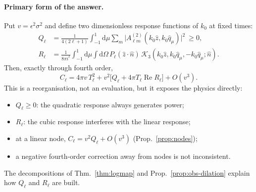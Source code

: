 \documentclass[11pt]{article}
\theoremstyle{definition}
\theoremstyle{remark}
\newcommand{\eps}{\epsilon}
\newcommand{\nh}{\hat n}
\newcommand{\dd}{\mathrm{d}}
\begin{document}
\paragraph{Primary form of the answer.} Put $v=\eps^2\sigma^2$ and define two dimensionless
response functions of $k_0$ at fixed times:
\begin{align}
Q_\ell&=\frac1{4(2\ell+1)}\int_{-1}^1\!\dd\mu\sum_m\big|A^{(2)}_{\ell m}(k_0\hat z,k_0\hat q_\mu)\big|^2\ \ge0,\\
R_\ell&=\frac1{8\pi i^\ell}\int_{-1}^1\!\dd\mu\int\!\dd\Omega\,P_\ell(\hat z\cdot\nh)\,
\mathcal K_3(k_0\hat z,k_0\hat q_\mu,-k_0\hat q_\mu;\nh).
\end{align}
Then, exactly through fourth order,
\begin{equation}\label{eq:primary}
\boxed{C_\ell=4\pi v\,T_\ell^2+v^2\big[Q_\ell+4\pi T_\ell\operatorname{Re}R_\ell\big]+O(v^3).}
\end{equation}
This is a reorganisation, not an evaluation, but it exposes the physics directly:
\begin{itemize}
\item $Q_\ell\ge0$: the quadratic response always generates power;
\item $R_\ell$: the cubic response interferes with the linear response;
\item at a linear node, $C_\ell=v^2Q_\ell+O(v^3)$ (Prop.~\ref{prop:nodes});
\item a negative fourth-order correction away from nodes is not inconsistent.
\end{itemize}
The decompositions of Thm.~\ref{thm:logmap} and Prop.~\ref{prop:obs-dilation} explain how
$Q_\ell$ and $R_\ell$ are built.
\end{document}
